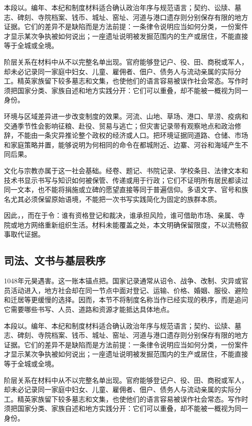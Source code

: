 本段以。编年、本纪和制度材料适合确认政治年序与规范语言；契约、讼牍、墓志、碑刻、寺院档案、钱币、城址、窑址、河道与港口遗存则分别保存有限的地方证据。它们的差异不是缺陷而是方法前提：一条律令说明应当如何分类，一份案件才显示某次争执被如何说出；一座遗址说明被发掘范围内的生产或居住，不能直接等于全城或全境。

阶层关系在材料中从不以完整名单出现。官府能够登记户、役、田、商税或军人，却未必记录同一家庭中妇女、儿童、雇佣者、佃户、债务人与流动亲属的实际分工。精英家族留下较多墓志和文集，也使他们的语言容易被误作社会常态。写作时须把国家分类、家族自述和地方实践分开：它们可以重叠，却不能被一概视为同一身份。

环境与区域差异进一步改变制度的效果。河流、山地、草场、港口、旱涝、疫病和交通季节性会影响征粮、赴役、贸易与逃亡；但灾害记录带有观察地点和政治修辞，不能由一条灾异推论整个政权的经济或人口。把环境证据同道路、仓储、市场和家庭策略并置，能够说明为何相同的命令在都城附近、边寨、河谷和海域产生不同后果。

文化与宗教亦属于这一社会基础。经卷、题记、书院记录、学校条目、法律文本和技术书显示书写与知识如何被保管、传递或用于行政；它们不证明所有居民都读过同一文本，也不能将捐施或立碑的愿望直接等同于普遍信仰。多语文字、官号和族名尤其必须保留原始语境，不能把一次书写实践简化为固定的族群本质。

因此，，而在于令：谁有资格登记和裁决，谁承担风险，谁可借助市场、亲属、寺院或地方网络重新组织生活。材料未能覆盖之处，本文明确保留限度，不以流畅叙事取代证据。

\subsection{司法、文书与基层秩序}

1048年元昊遇害。这一账本锚点把。国家记录通常从诏令、战争、改制、灾异或官员活动进入，地方社会却在同一节点中面对登记、运输、价格、婚姻、服役、避险和迁居等更缓慢的选择。因而，本节不将制度名称当作已经实现的秩序，而是追问它需要哪些书写、人员、道路和资源才能抵达具体地点。

本段以。编年、本纪和制度材料适合确认政治年序与规范语言；契约、讼牍、墓志、碑刻、寺院档案、钱币、城址、窑址、河道与港口遗存则分别保存有限的地方证据。它们的差异不是缺陷而是方法前提：一条律令说明应当如何分类，一份案件才显示某次争执被如何说出；一座遗址说明被发掘范围内的生产或居住，不能直接等于全城或全境。

阶层关系在材料中从不以完整名单出现。官府能够登记户、役、田、商税或军人，却未必记录同一家庭中妇女、儿童、雇佣者、佃户、债务人与流动亲属的实际分工。精英家族留下较多墓志和文集，也使他们的语言容易被误作社会常态。写作时须把国家分类、家族自述和地方实践分开：它们可以重叠，却不能被一概视为同一身份。

